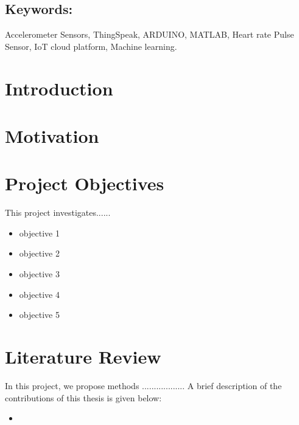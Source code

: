 \documentclass[12pt,a4paper,oneside]{report}
\begin{document}
		\subsection*{Keywords:}Accelerometer Sensors, ThingSpeak, ARDUINO, MATLAB, Heart rate Pulse Sensor, IoT cloud platform, Machine learning.
		
	
	
	
	\newpage
	\section{Introduction}
	\lipsum[2-4]\cite{shaoo2020}
	
	
	
	
	
	
	
	\section{Motivation}
	\lipsum[2-4]
	
	
	\section{Project Objectives}
	This project investigates......
	\begin{itemize}
		\item objective 1
		\item objective 2
		\item objective 3
		\item objective 4
		\item  objective 5
		
	\end{itemize}
	
	
	
	
	
	\section{Literature Review}
	In this project, we propose methods .................. A brief description of the contributions of this thesis is given below:
	\begin{itemize}
		\item
		
		
	\end{itemize}
	
\end{document}
